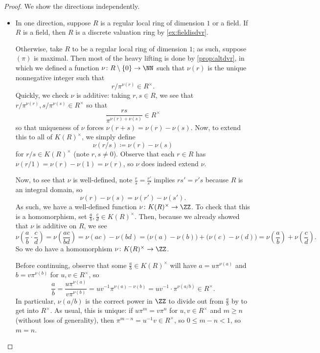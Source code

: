 \documentclass[../notes.tex]{subfiles}
\begin{document}
\begin{proof}
	We show the directions independently.
	\begin{itemize}
		\item In one direction, suppose $R$ is a regular local ring of dimension $1$ or a field. If $R$ is a field, then $R$ is a discrete valuation ring by \autoref{ex:fieldisdvr}.

		Otherwise, take $R$ to be a regular local ring of dimension $1$; as such, suppose $(\pi)$ is maximal. Then most of the heavy lifting is done by \autoref{prop:altdvr}, in which we defined a function $\nu\colon R\setminus\{0\}\to\NN$ such that $\nu(r)$ is the unique nonnegative integer such that
		\[r/\pi^{\nu(r)}\in R^\times.\]
		Quickly, we check $\nu$ is additive: taking $r,s\in R$, we see that $r/\pi^{\nu(r)},s/\pi^{\nu(s)}\in R^\times$ so that
		\[\frac{rs}{\pi^{\nu(r)+\nu(s)}}\in R^\times\]
		so that uniqueness of $\nu$ forces $\nu(r+s)=\nu(r)-\nu(s)$. Now, to extend this to all of $K(R)^\times$, we simply define
		\[\nu(r/s)\coloneqq\nu(r)-\nu(s)\]
		for $r/s\in K(R)^\times$ (note $r,s\ne0$). Observe that each $r\in R$ has $\nu(r/1)=\nu(r)-\nu(1)=\nu(r)$, so $\nu$ does indeed extend $\nu$.
		
		Now, to see that $\nu$ is well-defined, note $\frac rs=\frac{r'}{s'}$ implies $rs'=r's$ because $R$ is an integral domain, so
		\[\nu(r)-\nu(s)=\nu(r')-\nu(s').\]
		As such, we have a well-defined function $\nu\colon K(R)^\times\to\ZZ$. To check that this is a homomorphism, set $\frac ab,\frac cd\in K(R)^\times$. Then, because we already showed that $\nu$ is additive on $R$, we see
		\[\nu\left(\frac ab\cdot\frac cd\right)=\nu\left(\frac{ac}{bd}\right)=\nu(ac)-\nu(bd)=\big(\nu(a)-\nu(b)\big)+\big(\nu(c)-\nu(d)\big)=\nu\left(\frac ab\right)+\nu\left(\frac cd\right).\]
		So we do have a homomorphism $\nu\colon K(R)^\times\to\ZZ$.
		
		Before continuing, observe that some $\frac ab\in K(R)^\times$ will have $a=u\pi^{\nu(a)}$ and $b=v\pi^{\nu(b)}$ for $u,v\in R^\times$, so
		\[\frac ab=\frac{u\pi^{\nu(a)}}{v\pi^{\nu(b)}}=uv^{-1}\pi^{\nu(a)-\nu(b)}=uv^{-1}\cdot\pi^{\nu(a/b)}\in R^\times.\]
		In particular, $\nu(a/b)$ is the correct power in $\ZZ$ to divide out from $\frac ab$ by to get into $R^\times$. As usual, this is unique: if $u\pi^m=v\pi^n$ for $u,v\in R^\times$ and $m\ge n$ (without loss of generality), then $\pi^{m-n}=u^{-1}v\in R^\times$, so $0\le m-n<1$, so $m=n$.


\end{itemize}
\end{proof}
\end{document}

